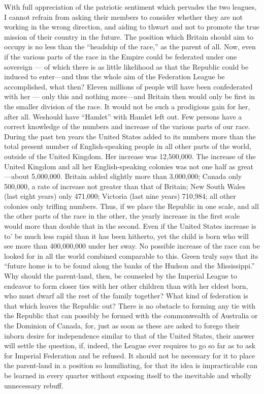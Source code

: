 \documentclass[11pt,openany]{book}
\begin{document}
With full appreciation of the patriotic sentiment which pervades the two leagues, I cannot refrain from asking their members to consider whether they are not working in the wrong direction, and aiding to thwart and not to promote the true mission of their country in the future. The position which Britain should aim to occupy is no less than the ``headship of the race,'' as the parent of all. Now, even if the various parts of the race in the Empire could be federated under one sovereign --- of which there is as little likelihood as that the Republic could be induced to enter---and thus the whole aim of the Federation League be accomplished, what then? Eleven millions of people will have been confederated with her --- only this and nothing more---and Britain then would only be first in the smaller division of the race. It would not be such a prodigious gain for her, after all. Weshould have ``Hamlet'' with Hamlet left out. Few persons have a correct knowledge of the numbers and increase of the various parts of our race. During the past ten years the United States added to its numbers more than the total present number of English-speaking people in all other parts of the world, outside of the United Kingdom. Her increase was 12,500,000. The increase of the United Kingdom and all her English-speaking colonies was not one half as great---about 5,000,000. Britain added slightly more than 3,000,000; Canada only 500,000, a rate of increase not greater than that of Britain; New South Wales (last eight years) only 471,000; Victoria (last nine years) 710,984; all other colonies only trifling numbers. Thus, if we place the Republic in one scale, and all the other parts of the race in the other, the yearly increase in the first scale would more than double that in the second. Even if the United States increase is to' be much less rapid than it has been hitherto, yet the child is born who will see more than 400,000,000 under her sway. No possible increase of the race can be looked for in all the world combined comparable to this. Green truly says that its ``future home is to be found along the banks of the Hudson and the Mississippi.'' Why should the parent-land, then, be counseled by the Imperial League to endeavor to form closer ties with her other children than with her eldest born, who must dwarf all the rest of the family together? What kind of federation is that which leaves the Republic out? There is no obstacle to forming any tie with the Republic that can possibly be formed with the commonwealth of Australia or the Dominion of Canada, for, just as soon as these are asked to forego their inborn desire for independence similar to that of the United States, their answer will settle the question, if, indeed, the League ever requires to go so far as to ask for Imperial Federation and be refused. It should not be necessary for it to place the parent-land in a position so humiliating, for that its idea is impracticable can be learned in every quarter without exposing itself to the inevitable and wholly unnecessary rebuff.
\end{document}
